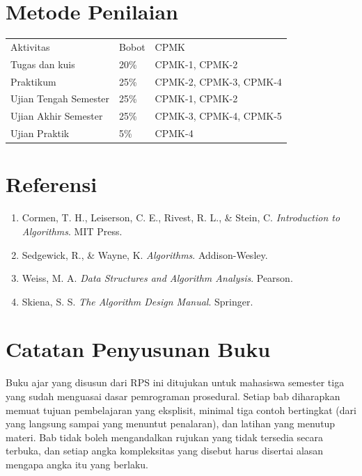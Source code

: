 \section*{Metode Penilaian}

\begin{tabular}{lll}
Aktivitas              & Bobot & CPMK \\
Tugas dan kuis         & 20\%  & CPMK-1, CPMK-2 \\
Praktikum              & 25\%  & CPMK-2, CPMK-3, CPMK-4 \\
Ujian Tengah Semester  & 25\%  & CPMK-1, CPMK-2 \\
Ujian Akhir Semester   & 25\%  & CPMK-3, CPMK-4, CPMK-5 \\
Ujian Praktik          & 5\%   & CPMK-4 \\
\end{tabular}

\section*{Referensi}

\begin{enumerate}
  \item Cormen, T. H., Leiserson, C. E., Rivest, R. L., \& Stein, C.
        \emph{Introduction to Algorithms}. MIT Press.
  \item Sedgewick, R., \& Wayne, K. \emph{Algorithms}. Addison-Wesley.
  \item Weiss, M. A. \emph{Data Structures and Algorithm Analysis}.
        Pearson.
  \item Skiena, S. S. \emph{The Algorithm Design Manual}. Springer.
\end{enumerate}

\section*{Catatan Penyusunan Buku}

Buku ajar yang disusun dari RPS ini ditujukan untuk mahasiswa semester tiga
yang sudah menguasai dasar pemrograman prosedural. Setiap bab diharapkan
memuat tujuan pembelajaran yang eksplisit, minimal tiga contoh bertingkat
(dari yang langsung sampai yang menuntut penalaran), dan latihan yang
menutup materi. Bab tidak boleh mengandalkan rujukan yang tidak tersedia
secara terbuka, dan setiap angka kompleksitas yang disebut harus disertai
alasan mengapa angka itu yang berlaku.
